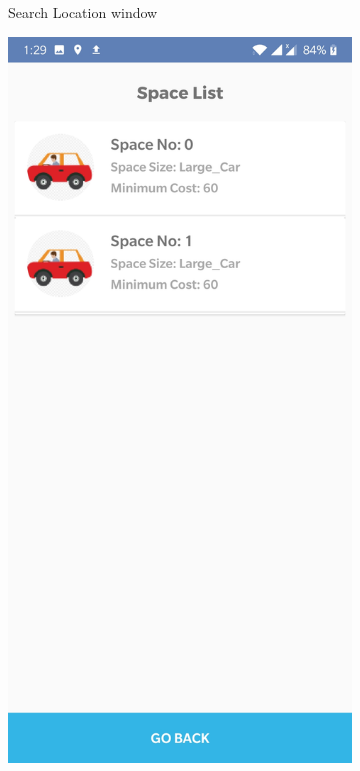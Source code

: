 \documentclass[12pt, english]{article}
\begin{document}
\begin{figure}[h!]
\begin{subfigure}[t]{0.3\textwidth}
        \label{arch5}
        \caption{Search Location window}
    \end{subfigure}
    \begin{subfigure}[t]{0.3\textwidth}
    \includegraphics[width=\linewidth]{Location_Selection/showing_space_list_for_adding_vehicles.jpg}

\end{subfigure}
\end{figure}
\end{document}
